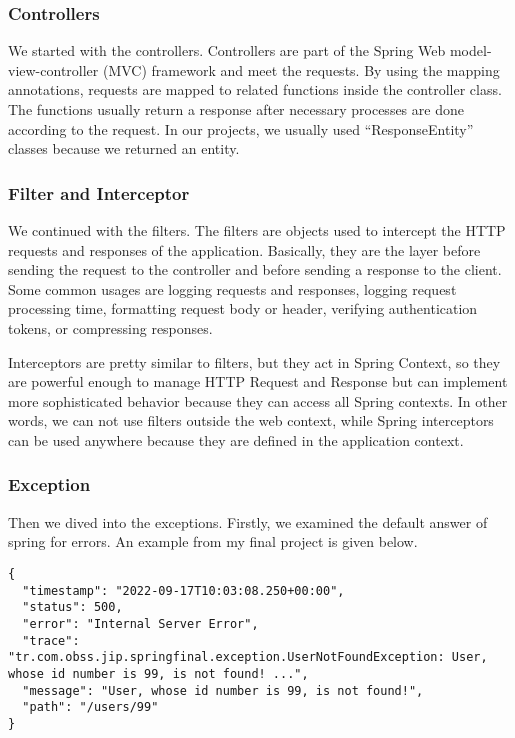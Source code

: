 \subsubsection{Controllers}

We started with the controllers. Controllers are part of the Spring Web model-view-controller (MVC) framework and meet the requests. By using the mapping annotations, requests are mapped to related functions inside the controller class. The functions usually return a response after necessary processes are done according to the request. In our projects, we usually used ``ResponseEntity'' classes because we returned an entity.

\subsubsection{Filter and Interceptor}

We continued with the filters. The filters are objects used to intercept the HTTP requests and responses of the application. Basically, they are the layer before sending the request to the controller and before sending a response to the client. Some common usages are logging requests and responses, logging request processing time, formatting request body or header, verifying authentication tokens, or compressing responses.

Interceptors are pretty similar to filters, but they act in Spring Context, so they are powerful enough to manage HTTP Request and Response but can implement more sophisticated behavior because they can access all Spring contexts. In other words, we can not use filters outside the web context, while Spring interceptors can be used anywhere because they are defined in the application context.

\subsubsection{Exception}

Then we dived into the exceptions. Firstly, we examined the default answer of spring for errors. An example from my final project is given below. 
\begin{verbatim}
{
  "timestamp": "2022-09-17T10:03:08.250+00:00",
  "status": 500,
  "error": "Internal Server Error",
  "trace": "tr.com.obss.jip.springfinal.exception.UserNotFoundException: User, whose id number is 99, is not found! ...",
  "message": "User, whose id number is 99, is not found!",
  "path": "/users/99"
}
\end{verbatim}

